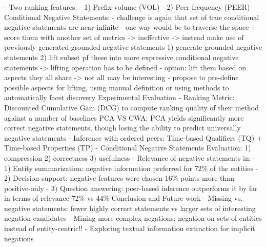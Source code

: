     - Two ranking features:
    - 1) Prefix-volume (VOL)
    - 2) Peer frequency (PEER)
Conditional Negative Statements:
    - challenge is again  that set of true conditional negative statements are near-infinite
    - one way would be to traverse the space + score them with another set of metrics -> ineffective
    -> instead make use of previously generated grounded negative statements
    1) generate grounded negative statements
    2) lift subset pf these into more expressive conditional negative statements -> lifting operation has to be defined
    - option: lift them based on aspects they all share -> not all may be interesting
    - propose to pre-define possible aspects for lifting, using manual definition or using methods to automatically facet discovery
Experimental Evaluation
    - Ranking Metric: Discounted Cumulative Gain (DCG) to compute ranking quality of their method against a number of    baselines
     PCA VS CWA: PCA yields significantly more correct negative statements, though losing the ability to predict universally negative statements
    - Inference with ordered peers: Time-based Qualifiers (TQ) + Time-based Properties (TP)
    - Conditional Negative Statements Evaluation: 1) compression 2) correctness 3) usefulness
    - Relevance of negative statements in:
    - 1) Entity summarization: negative information preferred for 72\% of the entities
    - 2) Decision support: negative features were chosen 16\% points more than positive-only
    - 3) Question answering: peer-based inference outperforms it by far in terms of relevance 72\% vs 44\%
Conclusion and Future work
    - Missing vs. negative statements: fewer highly correct statements vs larger sets of interesting negation candidates
    - Mining more complex negations: negation on sets of entities instead of entity-centric!!
    - Exploring textual information extraction for implicit negations
    
    
    
